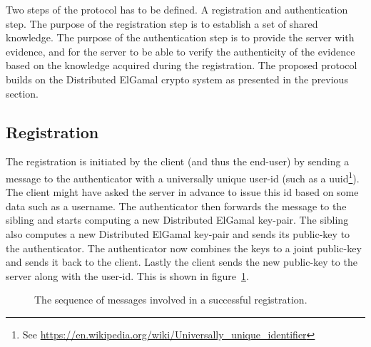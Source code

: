 Two steps of the protocol has to be defined. A \gls{registration} and \gls{authentication} step. The purpose of the registration step is to establish a set of shared knowledge. The purpose of the authentication step is to provide the \gls{server} with evidence, and for the \gls{server} to be able to verify the authenticity of the evidence based on the knowledge acquired during the registration. The proposed protocol builds on the Distributed ElGamal crypto system as presented in the previous section.


\subsection{Registration}

The registration is initiated by the \gls{client} (and thus the end-user) by sending a message to the \gls{authenticator} with a universally unique user-id (such as a uuid\footnote{See \url{https://en.wikipedia.org/wiki/Universally_unique_identifier}}). The \gls{client} might have asked the \gls{server} in advance to issue this id based on some data such as a username. The \gls{authenticator} then forwards the message to the \gls{sibling} and starts computing a new Distributed ElGamal key-pair. The \gls{sibling} also computes a new Distributed ElGamal key-pair and sends its public-key to the \gls{authenticator}. The \gls{authenticator} now combines the keys to a joint public-key and sends it back to the \gls{client}. Lastly the \gls{client} sends the new public-key to the server along with the user-id. This is shown in figure~\ref{msc:register}.

\begin{figure}[bth]
\centering
{}
\caption[Registration sequence diagram]{The sequence of messages involved in a successful registration.}
\label{msc:register}
\end{figure}


